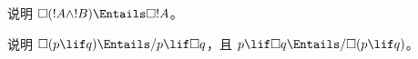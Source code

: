\documentclass[../../../include/open-logic-section]{subfiles}
\begin{document}
\begin{prob}
  说明 $\Box (!A \land !B) \Entails \Box !A$。
\end{prob}

\begin{prob}
  说明 $\Box (p \lif q) \Entails/ p \lif \Box q$，且 $p \lif \Box q
  \Entails/\Box (p \lif q)$。
\end{prob}
\end{document}
